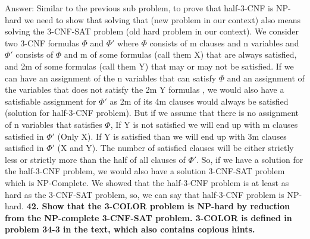 \documentclass{article}
\begin{document}
Answer: Similar to the previous sub problem, to prove that half-3-CNF is NP-hard we need to show that solving that (new problem in our context) also means solving the 3-CNF-SAT problem (old hard problem in our context). We consider two 3-CNF formulas $\Phi$ and $\Phi'$ where $\Phi$ consists of m clauses and n variables and $\Phi'$ consists of $\Phi$ and m of some formulas (call them X) that are always satisfied, and 2m of some formulas (call them Y) that may or may not be satisfied. If we can have an assignment of the n variables that can satisfy $\Phi$ and an assignment of the variables that does not satisfy the 2m Y formulas , we would also have a satisfiable assignment for $\Phi'$ as 2m of its 4m clauses would always be satisfied (solution for half-3-CNF problem). But if we assume that there is no assignment of n variables that satisfies $\Phi$, If Y is not satisfied we will end up with m clauses satisfied in $\Phi'$ (Only X). If Y is satisfied than we will end up with 3m clauses satisfied in $\Phi'$ (X and Y). The number of satisfied clauses will be either strictly less or strictly more than the half of all clauses of $\Phi'$. So, if we  have a solution for the half-3-CNF problem, we would also have a solution 3-CNF-SAT problem which is NP-Complete. We showed that the half-3-CNF problem is at least as hard as the 3-CNF-SAT problem, so, we can say that half-3-CNF problem is NP-hard.
\textbf{42. Show that the 3-COLOR problem is NP-hard by reduction from the NP-complete 3-CNF-SAT problem. 3-COLOR is defined in problem 34-3 in the text, which also contains copious hints.}
\end{document}
